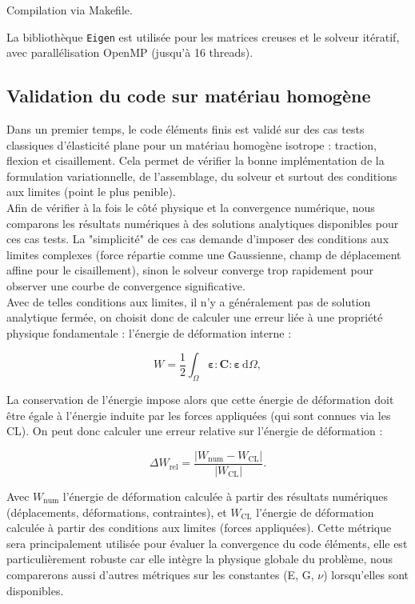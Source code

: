 \documentclass[a4paper,11pt]{article}
\begin{document}
Compilation via Makefile.

La bibliothèque \texttt{Eigen} est utilisée pour les matrices creuses et le solveur itératif, avec parallélisation OpenMP (jusqu’à 16 threads).
\subsection{Validation du code sur matériau homogène}

Dans un premier temps, le code éléments finis est validé sur des cas tests classiques d'élasticité plane pour un matériau homogène isotrope : traction, flexion et cisaillement. Cela permet de vérifier la bonne implémentation de la formulation variationnelle, de l'assemblage, du solveur et surtout des conditions aux limites (point le plus penible). \\

Afin de vérifier à la fois le côté physique et la convergence numérique, nous comparons les résultats numériques à des solutions analytiques disponibles pour ces cas tests. La "simplicité" de ces cas demande d'imposer des conditions aux limites complexes (force répartie comme une Gaussienne, champ de déplacement affine pour le cisaillement), sinon le solveur converge trop rapidement pour observer une courbe de convergence significative. \\

Avec de telles conditions aux limites, il n'y a généralement pas de solution analytique fermée, on choisit donc de calculer une erreur liée à une propriété physique fondamentale : l'énergie de déformation interne :

\begin{equation}
W = \frac{1}{2} \int_\Omega \boldsymbol{\varepsilon} : \mathbf{C} : \boldsymbol{\varepsilon}\,\mathrm{d}\Omega,
\end{equation}

La conservation de l'énergie impose alors que cette énergie de déformation doit être égale à l'énergie induite par les forces appliquées (qui sont connues via les CL). On peut donc calculer une erreur relative sur l'énergie de déformation :

\begin{equation}
\Delta W_{\text{rel}} = \frac{|W_{\text{num}} - W_{\text{CL}}|}{|W_{\text{CL}}|}.
\end{equation}

Avec $W_{\text{num}}$ l'énergie de déformation calculée à partir des résultats numériques (déplacements, déformations, contraintes), et $W_{\text{CL}}$ l'énergie de déformation calculée à partir des conditions aux limites (forces appliquées). Cette métrique sera principalement utilisée pour évaluer la convergence du code éléments, elle est particulièrement robuste car elle intègre la physique globale du problème, nous comparerons aussi d'autres métriques sur les constantes (E, G, $\nu$) lorsqu'elles sont disponibles. \\
\end{document}
